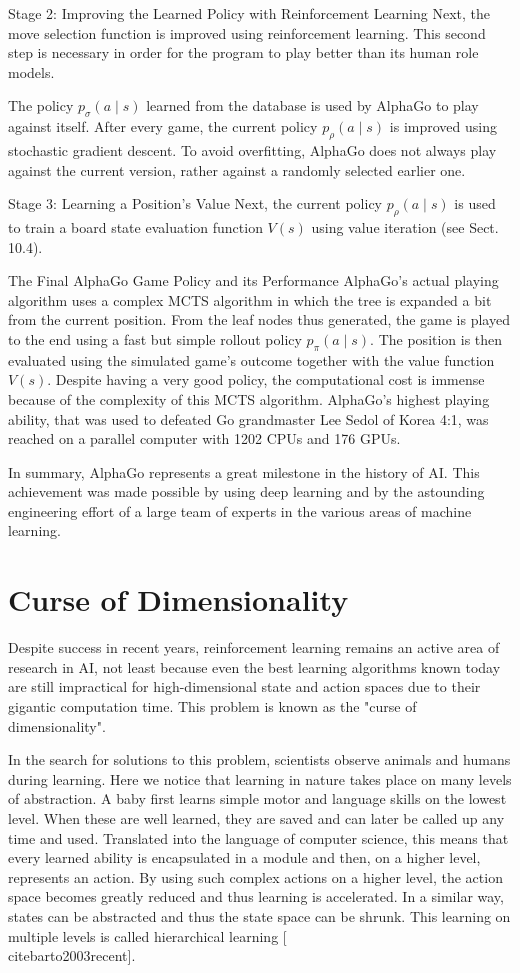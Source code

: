 \documentclass[10pt]{book}
\begin{document}
Stage 2: Improving the Learned Policy with Reinforcement Learning Next, the move selection function is improved using reinforcement learning. This second step is necessary in order for the program to play better than its human role models.

The policy $p_{\sigma}(a \mid s)$ learned from the database is used by AlphaGo to play against itself. After every game, the current policy $p_{\rho}(a \mid s)$ is improved using stochastic gradient descent. To avoid overfitting, AlphaGo does not always play against the current version, rather against a randomly selected earlier one.

Stage 3: Learning a Position's Value Next, the current policy $p_{\rho}(a \mid s)$ is used to train a board state evaluation function $V(s)$ using value iteration (see Sect. 10.4).

The Final AlphaGo Game Policy and its Performance AlphaGo's actual playing algorithm uses a complex MCTS algorithm in which the tree is expanded a bit from the current position. From the leaf nodes thus generated, the game is played to the end using a fast but simple rollout policy $p_{\pi}(a \mid s)$. The position is then evaluated using the simulated game's outcome together with the value function $V(s)$. Despite having a very good policy, the computational cost is immense because of the complexity of this MCTS algorithm. AlphaGo's highest playing ability, that was used to defeated Go grandmaster Lee Sedol of Korea 4:1, was reached on a parallel computer with 1202 CPUs and 176 GPUs.

In summary, AlphaGo represents a great milestone in the history of AI. This achievement was made possible by using deep learning and by the astounding engineering effort of a large team of experts in the various areas of machine learning.

\section{Curse of Dimensionality}
Despite success in recent years, reinforcement learning remains an active area of research in AI, not least because even the best learning algorithms known today are still impractical for high-dimensional state and action spaces due to their gigantic computation time. This problem is known as the "curse of dimensionality".

In the search for solutions to this problem, scientists observe animals and humans during learning. Here we notice that learning in nature takes place on many levels of abstraction. A baby first learns simple motor and language skills on the lowest level. When these are well learned, they are saved and can later be called up any time and used. Translated into the language of computer science, this means that every learned ability is encapsulated in a module and then, on a higher level, represents an action. By using such complex actions on a higher level, the action space becomes greatly reduced and thus learning is accelerated. In a similar way, states can be abstracted and thus the state space can be shrunk. This learning on multiple levels is called hierarchical learning [\\cite{barto2003recent}].
\end{document}
